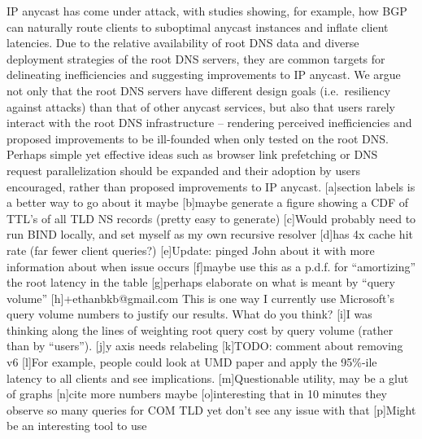 \documentclass[sigconf,nonacm,10pt]{acmart}
\begin{document}
IP anycast has come under attack, with studies showing, for example, how
BGP can naturally route clients to suboptimal anycast instances and
inflate client latencies. Due to the relative availability of root DNS
data and diverse deployment strategies of the root DNS servers, they are
common targets for delineating inefficiencies and suggesting
improvements to IP anycast. We argue not only that the root DNS servers
have different design goals (i.e.~resiliency against attacks) than that
of other anycast services, but also that users rarely interact with the
root DNS infrastructure -- rendering perceived inefficiencies and
proposed improvements to be ill-founded when only tested on the root
DNS. Perhaps simple yet effective ideas such as browser link prefetching
or DNS request parallelization should be expanded and their adoption by
users encouraged, rather than proposed improvements to IP anycast.
{[}a{]}section labels is a better way to go about it maybe {[}b{]}maybe
generate a figure showing a CDF of TTL's of all TLD NS records (pretty
easy to generate) {[}c{]}Would probably need to run BIND locally, and
set myself as my own recursive resolver {[}d{]}has 4x cache hit rate
(far fewer client queries?) {[}e{]}Update: pinged John about it with
more information about when issue occurs {[}f{]}maybe use this as a
p.d.f. for ``amortizing'' the root latency in the table {[}g{]}perhaps
elaborate on what is meant by ``query volume''
{[}h{]}+ethanbkb@gmail.com This is one way I currently use Microsoft's
query volume numbers to justify our results. What do you think? {[}i{]}I
was thinking along the lines of weighting root query cost by query
volume (rather than by ``users''). {[}j{]}y axis needs relabeling
{[}k{]}TODO: comment about removing v6 {[}l{]}For example, people could
look at UMD paper and apply the 95\%-ile latency to all clients and see
implications. {[}m{]}Questionable utility, may be a glut of graphs
{[}n{]}cite more numbers maybe {[}o{]}interesting that in 10 minutes
they observe so many queries for COM TLD yet don't see any issue with
that {[}p{]}Might be an interesting tool to use


\end{document}
